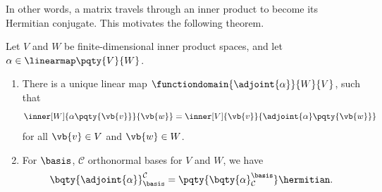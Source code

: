 In other words, a matrix travels through an inner product to become its Hermitian conjugate. This motivates the following theorem.

\begin{theorem}
    \label{thm:adjoint-map}%
    Let \(V\) and \(W\) be finite-dimensional inner product spaces, and let \(\alpha \in \linearmap\pqty{V}{W}\).

    \begin{enumerate}[label=(\roman*)]
        \item There is a unique linear map \(\functiondomain{\adjoint{\alpha}}{W}{V}\), such that
        \[
            \inner[W]{\alpha\pqty{\vb{v}}}{\vb{w}} = \inner[V]{\vb{v}}{\adjoint{\alpha}\pqty{\vb{w}}}
        \]
        for all \(\vb{v} \in V\) and \(\vb{w} \in W\).

        \item For \(\basis\), \(\mathcal{C}\) orthonormal bases for \(V\) and \(W\), we have
        \[
            \bqty{\adjoint{\alpha}}_{\basis}^{\mathcal{C}} = \pqty{\bqty{\alpha}_{\mathcal{C}}^{\basis}}\hermitian.
        \]
    \end{enumerate}
\end{theorem}

